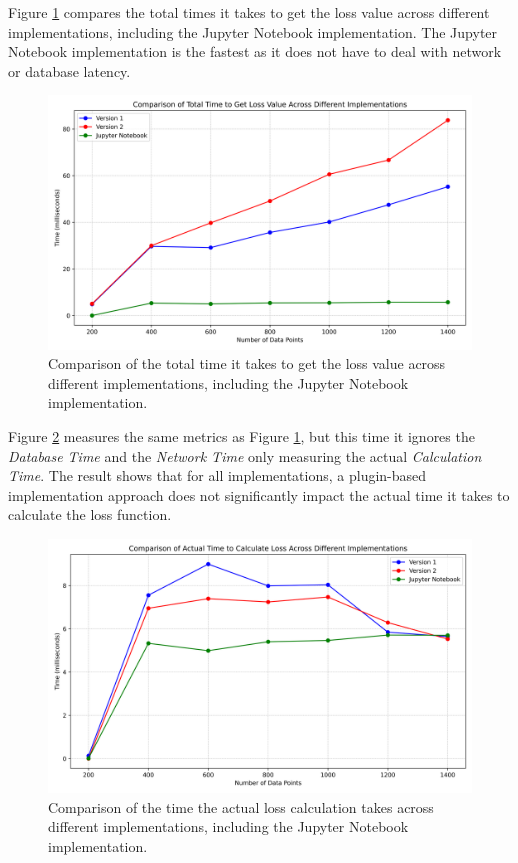 \documentclass[
  a4paper,  %
  twoside,  %
  bibliography=totoc,
  headsepline,
  cleardoublepage=empty,
  parskip=half,
  draft=false
]{scrbook}
\begin{document}
Figure \ref{fig:coparison_of_of} compares the total times it takes to get the loss value across different implementations, including the Jupyter Notebook implementation.
The Jupyter Notebook implementation is the fastest as it does not have to deal with network or database latency.

\begin{figure}
  \centering
  \includegraphics[width=\textwidth]{graphics/comparison_of_of.png}
  \caption[Total times to get loss value compared]{Comparison of the total time it takes to get the loss value across different implementations, including the Jupyter Notebook implementation.}
  \label{fig:coparison_of_of}
\end{figure}

Figure \ref{fig:time_for_of_calc} measures the same metrics as Figure \ref{fig:coparison_of_of}, but this time it ignores the \emph{Database Time} and the \emph{Network Time} only measuring the actual \emph{Calculation Time}.
The result shows that for all implementations, a plugin-based implementation approach does not significantly impact the actual time it takes to calculate the loss function.

\begin{figure}
  \centering
  \includegraphics[width=\textwidth]{graphics/time_for_of_calc.png}
  \caption[Times to calculate the loss function compared]{Comparison of the time the actual loss calculation takes across different implementations, including the Jupyter Notebook implementation.}
  \label{fig:time_for_of_calc}
\end{figure}
\end{document}
